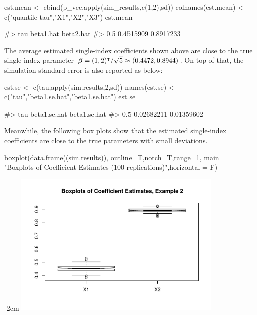 \begin{Schunk}

\begin{Sinput}
  est.mean <- cbind(p_vec,apply(sim_results,c(1,2),sd))
  colnames(est.mean) <- c("quantile tau","X1","X2","X3")
  est.mean
\end{Sinput}
\begin{Soutput}
  #> tau beta1.hat beta2.hat 
  #> 0.5 0.4515909 0.8917233
\end{Soutput}

The average estimated single-index coefficients shown above are close to the true single-index parameter $\mbox{\boldmath$\beta$} = (1,2)^{\intercal} / \sqrt{5} \approx(0.4472,0.8944)$. On top of that, the simulation standard error is also reported as below: 

\begin{Sinput}
  est.se <- c(tau,apply(sim.results,2,sd))
  names(est.se) <- c("tau","beta1.se.hat","beta1.se.hat")
  est.se
\end{Sinput}
\begin{Soutput}
  #>   tau beta1.se.hat beta1.se.hat 
  #>   0.5   0.02682211   0.01359602
\end{Soutput}

Meanwhile, the following box plots show that the estimated single-index coefficients are close to the true parameters with small deviations. 

\begin{Sinput}
  boxplot(data.frame((sim.results)), outline=T,notch=T,range=1,
  main = "Boxplots of Coefficient Estimates (100 replications)",horizontal = F)
\end{Sinput}

\centering
\addtolength{\leftskip} {-2cm}
\addtolength{\rightskip}{-2cm}
\includegraphics[width=10cm]{siqr_files/figure-latex/unnamed-chunk-14-1} 

\end{Schunk}

